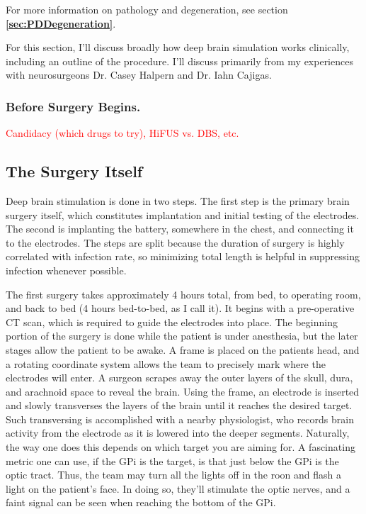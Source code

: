 For more information on pathology and degeneration, see section \textbf{\ref{sec:PDDegeneration}}.\newline

For this section, I'll discuss broadly how deep brain simulation works clinically, including an outline of the procedure. I'll discuss primarily from my experiences with neurosurgeons Dr. Casey Halpern and Dr. Iahn Cajigas.\newline



\subsubsection{Before Surgery Begins.}

\textcolor{red}{Candidacy (which drugs to try), HiFUS vs. DBS, etc. }


\subsection{The Surgery Itself}

Deep brain stimulation is done in two steps. The first step is the primary brain surgery itself, which constitutes implantation and initial testing of the electrodes. The second is implanting the battery, somewhere in the chest, and connecting it to the electrodes. The steps are split because the duration of surgery is highly correlated with infection rate, so minimizing total length is helpful in suppressing infection whenever possible.\newline

The first surgery takes approximately 4 hours total, from bed, to operating room, and back to bed (4 hours bed-to-bed, as I call it). It begins with a pre-operative CT scan, which is required to guide the electrodes into place. The beginning portion of the surgery is done while the patient is under anesthesia, but the later stages allow the patient to be awake. A frame is placed on the patients head, and a rotating coordinate system allows the team to precisely mark where the electrodes will enter. A surgeon scrapes away the outer layers of the skull, dura, and arachnoid space to reveal the brain. Using the frame, an electrode is inserted and slowly transverses the layers of the brain until it reaches the desired target. Such transversing is accomplished with a nearby physiologist, who records brain activity from the electrode as it is lowered into the deeper segments. Naturally, the way one does this depends on which target you are aiming for. A fascinating metric one can use, if the GPi is the target, is that just below the GPi is the optic tract. Thus, the team may turn all the lights off in the roon and flash a light on the patient's face. In doing so, they'll stimulate the optic nerves, and a faint signal can be seen when reaching the bottom of the GPi.\newline

